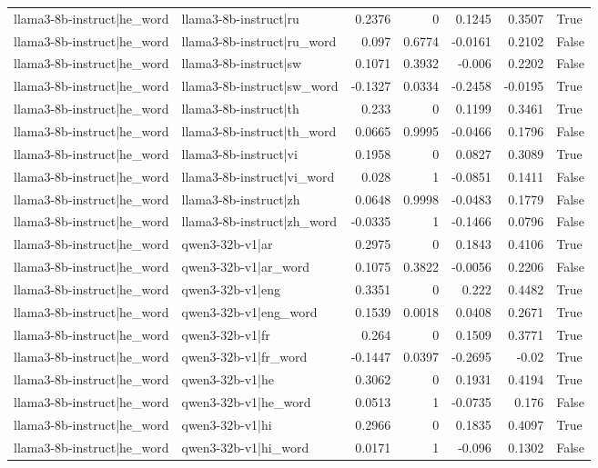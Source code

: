 \begin{table}
\begin{tabular}{l l r r r r l}
llama3-8b-instruct|he_word & llama3-8b-instruct|ru & 0.2376 & 0 & 0.1245 & 0.3507 & True \\
llama3-8b-instruct|he_word & llama3-8b-instruct|ru_word & 0.097 & 0.6774 & -0.0161 & 0.2102 & False \\
llama3-8b-instruct|he_word & llama3-8b-instruct|sw & 0.1071 & 0.3932 & -0.006 & 0.2202 & False \\
llama3-8b-instruct|he_word & llama3-8b-instruct|sw_word & -0.1327 & 0.0334 & -0.2458 & -0.0195 & True \\
llama3-8b-instruct|he_word & llama3-8b-instruct|th & 0.233 & 0 & 0.1199 & 0.3461 & True \\
llama3-8b-instruct|he_word & llama3-8b-instruct|th_word & 0.0665 & 0.9995 & -0.0466 & 0.1796 & False \\
llama3-8b-instruct|he_word & llama3-8b-instruct|vi & 0.1958 & 0 & 0.0827 & 0.3089 & True \\
llama3-8b-instruct|he_word & llama3-8b-instruct|vi_word & 0.028 & 1 & -0.0851 & 0.1411 & False \\
llama3-8b-instruct|he_word & llama3-8b-instruct|zh & 0.0648 & 0.9998 & -0.0483 & 0.1779 & False \\
llama3-8b-instruct|he_word & llama3-8b-instruct|zh_word & -0.0335 & 1 & -0.1466 & 0.0796 & False \\
llama3-8b-instruct|he_word & qwen3-32b-v1|ar & 0.2975 & 0 & 0.1843 & 0.4106 & True \\
llama3-8b-instruct|he_word & qwen3-32b-v1|ar_word & 0.1075 & 0.3822 & -0.0056 & 0.2206 & False \\
llama3-8b-instruct|he_word & qwen3-32b-v1|eng & 0.3351 & 0 & 0.222 & 0.4482 & True \\
llama3-8b-instruct|he_word & qwen3-32b-v1|eng_word & 0.1539 & 0.0018 & 0.0408 & 0.2671 & True \\
llama3-8b-instruct|he_word & qwen3-32b-v1|fr & 0.264 & 0 & 0.1509 & 0.3771 & True \\
llama3-8b-instruct|he_word & qwen3-32b-v1|fr_word & -0.1447 & 0.0397 & -0.2695 & -0.02 & True \\
llama3-8b-instruct|he_word & qwen3-32b-v1|he & 0.3062 & 0 & 0.1931 & 0.4194 & True \\
llama3-8b-instruct|he_word & qwen3-32b-v1|he_word & 0.0513 & 1 & -0.0735 & 0.176 & False \\
llama3-8b-instruct|he_word & qwen3-32b-v1|hi & 0.2966 & 0 & 0.1835 & 0.4097 & True \\
llama3-8b-instruct|he_word & qwen3-32b-v1|hi_word & 0.0171 & 1 & -0.096 & 0.1302 & False \\

\end{tabular}
\end{table}

